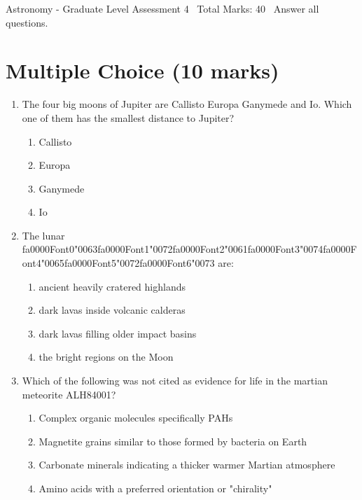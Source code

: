 \documentclass[12pt]{article}
\begin{document}
\begin{center}
Astronomy - Graduate Level Assessment 4 \
Total Marks: 40 \
Answer all questions.
\end{center}

\section*{Multiple Choice (10 marks)}
\begin{enumerate}[label=\arabic*.]
\item The four big moons of Jupiter are Callisto Europa Ganymede and Io. Which one of them has
the smallest distance to Jupiter?
\begin{enumerate}[label=(\alph*)]
    \item Callisto
    \item Europa
    \item Ganymede
    \item Io
\end{enumerate}
\item The lunar {\csname fa0000Font0\endcsname\char"0063}{\csname fa0000Font1\endcsname\char"0072}{\csname fa0000Font2\endcsname\char"0061}{\csname fa0000Font3\endcsname\char"0074}{\csname fa0000Font4\endcsname\char"0065}{\csname fa0000Font5\endcsname\char"0072}{\csname fa0000Font6\endcsname\char"0073} are:
\begin{enumerate}[label=(\alph*)]
    \item ancient heavily cratered highlands
    \item dark lavas inside volcanic calderas
    \item dark lavas filling older impact basins
    \item the bright regions on the Moon
\end{enumerate}
\item Which of the following was not cited as evidence for life in the martian meteorite
ALH84001?
\begin{enumerate}[label=(\alph*)]
    \item Complex organic molecules specifically PAHs
    \item Magnetite grains similar to those formed by bacteria on Earth
    \item Carbonate minerals indicating a thicker warmer Martian atmosphere
    \item Amino acids with a preferred orientation or "chirality"
\end{enumerate}

\end{enumerate}
\end{document}

